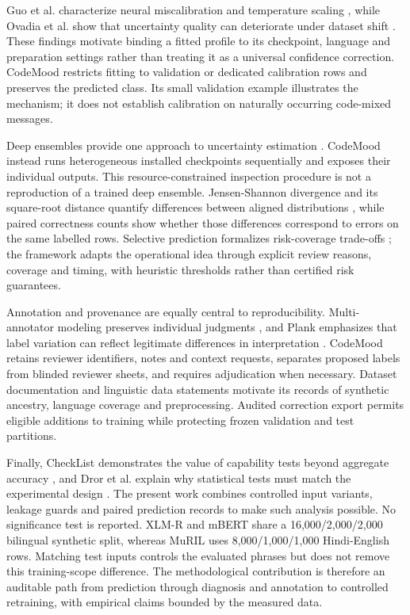\documentclass[journal]{IEEEtran}
\begin{document}
Guo et al. characterize neural miscalibration and temperature scaling \cite{guo2017}, while Ovadia et al. show that uncertainty quality can deteriorate under dataset shift \cite{ovadia2019}. These findings motivate binding a fitted profile to its checkpoint, language and preparation settings rather than treating it as a universal confidence correction. CodeMood restricts fitting to validation or dedicated calibration rows and preserves the predicted class. Its small validation example illustrates the mechanism; it does not establish calibration on naturally occurring code-mixed messages.

Deep ensembles provide one approach to uncertainty estimation \cite{lakshminarayanan2017}. CodeMood instead runs heterogeneous installed checkpoints sequentially and exposes their individual outputs. This resource-constrained inspection procedure is not a reproduction of a trained deep ensemble. Jensen-Shannon divergence and its square-root distance quantify differences between aligned distributions \cite{lin1991}, while paired correctness counts show whether those differences correspond to errors on the same labelled rows. Selective prediction formalizes risk-coverage trade-offs \cite{geifman2017}; the framework adapts the operational idea through explicit review reasons, coverage and timing, with heuristic thresholds rather than certified risk guarantees.

Annotation and provenance are equally central to reproducibility. Multi-annotator modeling preserves individual judgments \cite{davani2022}, and Plank emphasizes that label variation can reflect legitimate differences in interpretation \cite{plank2022}. CodeMood retains reviewer identifiers, notes and context requests, separates proposed labels from blinded reviewer sheets, and requires adjudication when necessary. Dataset documentation \cite{gebru2021} and linguistic data statements \cite{bender2018} motivate its records of synthetic ancestry, language coverage and preprocessing. Audited correction export permits eligible additions to training while protecting frozen validation and test partitions.

Finally, CheckList demonstrates the value of capability tests beyond aggregate accuracy \cite{ribeiro2020}, and Dror et al. explain why statistical tests must match the experimental design \cite{dror2018}. The present work combines controlled input variants, leakage guards and paired prediction records to make such analysis possible. No significance test is reported. XLM-R and mBERT share a 16,000/2,000/2,000 bilingual synthetic split, whereas MuRIL uses 8,000/1,000/1,000 Hindi-English rows. Matching test inputs controls the evaluated phrases but does not remove this training-scope difference. The methodological contribution is therefore an auditable path from prediction through diagnosis and annotation to controlled retraining, with empirical claims bounded by the measured data.
\end{document}
